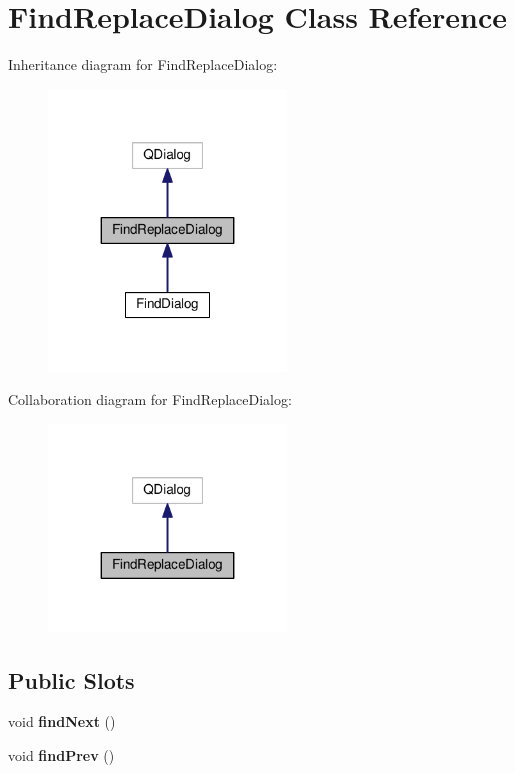 \hypertarget{classFindReplaceDialog}{}\section{Find\+Replace\+Dialog Class Reference}
\label{classFindReplaceDialog}


Inheritance diagram for Find\+Replace\+Dialog\+:\nopagebreak
\begin{figure}[H]
\begin{center}
\leavevmode
\includegraphics[width=179pt]{classFindReplaceDialog__inherit__graph}
\end{center}
\end{figure}


Collaboration diagram for Find\+Replace\+Dialog\+:\nopagebreak
\begin{figure}[H]
\begin{center}
\leavevmode
\includegraphics[width=179pt]{classFindReplaceDialog__coll__graph}
\end{center}
\end{figure}
\subsection*{Public Slots}
\begin{DoxyCompactItemize}
\item 
void {\bfseries find\+Next} ()\hypertarget{classFindReplaceDialog_ac4d4fa5eb9fdda240d855f05b5b6df68}{}\label{classFindReplaceDialog_ac4d4fa5eb9fdda240d855f05b5b6df68}

\item 
void {\bfseries find\+Prev} ()\hypertarget{classFindReplaceDialog_af48970c4a221387bc4df6b7f521af693}{}\label{classFindReplaceDialog_af48970c4a221387bc4df6b7f521af693}

\end{DoxyCompactItemize}
